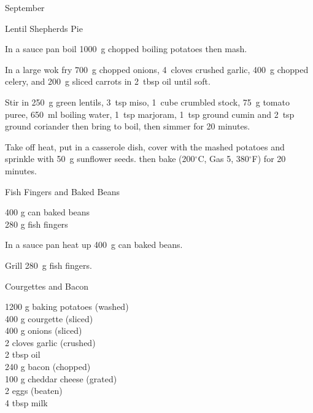 \begin{menu}{September}
\begin{recipe}{2}{Lentil Shepherds Pie}
    \begin{instructions}
    \item 
        In a sauce pan boil
        1000~g chopped boiling potatoes
        then mash.
      \item 
        In a large wok fry
        700~g chopped onions,
        4~cloves crushed garlic,
        400~g chopped celery,
        and
        200~g sliced carrots
        in
        2~tbsp  oil
        until soft.
      \item 
        Stir in
        250~g  green lentils,
        3~tsp  miso,
        1~cube crumbled stock,
        75~g  tomato puree,
        650~ml  boiling water,
        1~tsp  marjoram,
        1~tsp  ground cumin
        and
        2~tsp  ground coriander
        then bring to boil,
        then simmer for 20 minutes.
      \item 
        Take off heat,
        put in a casserole dish,
        cover with the mashed potatoes
        and sprinkle with
        50~g  sunflower seeds.
        then bake (200$^{\circ}$C, Gas 5, 380$^{\circ}$F) for 20 minutes.
      
    \end{instructions}
    \end{recipe}%
  
    \begin{recipe}{1}{Fish Fingers and Baked Beans}%
		\begin{ingredients}
		400 g can baked beans  \\
	280 g fish fingers  \\
	
		\end{ingredients}
	
	
    \begin{instructions}
    \item 
        In a sauce pan heat up
        400~g  can baked beans.
      \item 
        Grill
        280~g  fish fingers.
      
    \end{instructions}
    \end{recipe}%
  
    \begin{recipe}{2}{Courgettes and Bacon}%
		\begin{ingredients}
		1200 g baking potatoes (washed) \\
	400 g courgette (sliced) \\
	400 g onions (sliced) \\
	2 cloves garlic (crushed) \\
	2 tbsp oil  \\
	240 g bacon (chopped) \\
	100 g cheddar cheese (grated) \\
	2  eggs (beaten) \\
	4 tbsp milk  \\
	

\end{ingredients}
\end{recipe}
\end{menu}
